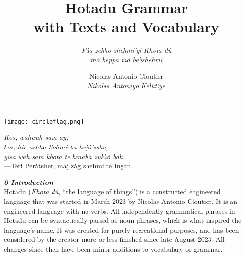 \documentclass{article}[10pt]
\title{Hotadu Grammar\\with Texts and Vocabulary}
\subtitle{
\emph{P\.{a}s zehho shehmi'gi Khota d\.{u}\\m\.{o} heppa m\.{o} babshehmi}
}
\author{Nicolas Antonio Cloutier\\\emph{Nikolas Antoniyo Kel\.{u}tiye}}
\begin{document}
\maketitle

\vspace{0.25in}

{\begin{center}
\texttt{[image: circleflag.png]} \end{center}}

\vspace{0.25in}

{\begin{center}
\emph{Kos, wahwah sam ay, \\kos, hir nehha Sohm\.{e} ba hej\.{o}'ssho, \\yisa wah sam khota te hmaha zukk\.{o} bak.\\}
\vspace{0.5cm}
---Teri Per\.{a}tshet, maj z\.{a}g shehmi te Ingan.
\end{center}}


\clearpage
{\bf \emph{0 Introduction}}\\

Hotadu (\emph{Khota d\.{u}}, ``the language of things'') is a constructed engineered language that was started in March 2023 by Nicolas Antonio Cloutier. It is an engineered language with no verbs. All independently grammatical phrases in Hotadu can be syntactically parsed as noun phrases, which is what inspired the language's name. It was created for purely recreational purposes, and has been considered by the creator more or less finished since late August 2023. All changes since then have been minor additions to vocabulary or grammar.\\
\end{document}

